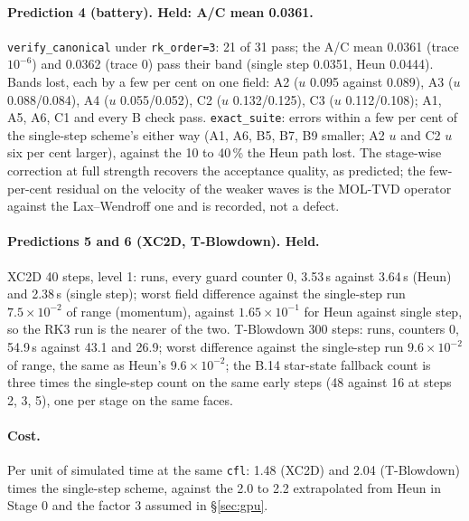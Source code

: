 \documentclass[11pt,a4paper]{article}
\newcommand{\code}[1]{\texttt{\small #1}}
\begin{document}
\paragraph{Prediction 4 (battery).  Held: A/C mean 0.0361.}
\code{verify\_canonical} under \code{rk\_order=3}: 21 of 31 pass; the
A/C mean 0.0361 (trace $10^{-6}$) and 0.0362 (trace 0) pass their band
(single step 0.0351, Heun 0.0444).  Bands lost, each by a few per cent on
one field: A2 ($u$ 0.095 against 0.089), A3 ($u$ 0.088/0.084), A4 ($u$
0.055/0.052), C2 ($u$ 0.132/0.125), C3 ($u$ 0.112/0.108); A1, A5, A6, C1
and every B check pass.  \code{exact\_suite}: errors within a few per
cent of the single-step scheme's either way (A1, A6, B5, B7, B9 smaller;
A2 $u$ and C2 $u$ six per cent larger), against the 10 to 40\,\% the Heun
path lost.  The stage-wise correction at full strength recovers the
acceptance quality, as predicted; the few-per-cent residual on the
velocity of the weaker waves is the MOL-TVD operator against the
Lax--Wendroff one and is recorded, not a defect.

\paragraph{Predictions 5 and 6 (XC2D, T-Blowdown).  Held.}
XC2D 40 steps, level 1: runs, every guard counter 0, 3.53\,s against
3.64\,s (Heun) and 2.38\,s (single step); worst field difference against
the single-step run $7.5\times10^{-2}$ of range (momentum), against
$1.65\times10^{-1}$ for Heun against single step, so the RK3 run is the
nearer of the two.  T-Blowdown 300 steps: runs, counters 0, 54.9\,s
against 43.1 and 26.9; worst difference against the single-step run
$9.6\times10^{-2}$ of range, the same as Heun's $9.6\times10^{-2}$; the
B.14 star-state fallback count is three times the single-step count on
the same early steps (48 against 16 at steps 2, 3, 5), one per stage on
the same faces.

\paragraph{Cost.}  Per unit of simulated time at the same \code{cfl}:
1.48 (XC2D) and 2.04 (T-Blowdown) times the single-step scheme, against
the 2.0 to 2.2 extrapolated from Heun in Stage 0 and the factor 3 assumed
in \S\ref{sec:gpu}.
\end{document}
